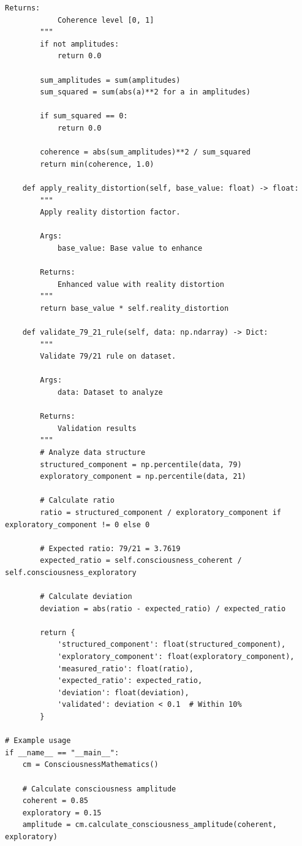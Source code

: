 \begin{lstlisting}[caption={79/21 Universal Coherence Rule Implementation},label={code:consciousness_math}]
        Returns:
            Coherence level [0, 1]
        """
        if not amplitudes:
            return 0.0
        
        sum_amplitudes = sum(amplitudes)
        sum_squared = sum(abs(a)**2 for a in amplitudes)
        
        if sum_squared == 0:
            return 0.0
        
        coherence = abs(sum_amplitudes)**2 / sum_squared
        return min(coherence, 1.0)
    
    def apply_reality_distortion(self, base_value: float) -> float:
        """
        Apply reality distortion factor.
        
        Args:
            base_value: Base value to enhance
        
        Returns:
            Enhanced value with reality distortion
        """
        return base_value * self.reality_distortion
    
    def validate_79_21_rule(self, data: np.ndarray) -> Dict:
        """
        Validate 79/21 rule on dataset.
        
        Args:
            data: Dataset to analyze
        
        Returns:
            Validation results
        """
        # Analyze data structure
        structured_component = np.percentile(data, 79)
        exploratory_component = np.percentile(data, 21)
        
        # Calculate ratio
        ratio = structured_component / exploratory_component if exploratory_component != 0 else 0
        
        # Expected ratio: 79/21 = 3.7619
        expected_ratio = self.consciousness_coherent / self.consciousness_exploratory
        
        # Calculate deviation
        deviation = abs(ratio - expected_ratio) / expected_ratio
        
        return {
            'structured_component': float(structured_component),
            'exploratory_component': float(exploratory_component),
            'measured_ratio': float(ratio),
            'expected_ratio': expected_ratio,
            'deviation': float(deviation),
            'validated': deviation < 0.1  # Within 10%
        }

# Example usage
if __name__ == "__main__":
    cm = ConsciousnessMathematics()
    
    # Calculate consciousness amplitude
    coherent = 0.85
    exploratory = 0.15
    amplitude = cm.calculate_consciousness_amplitude(coherent, exploratory)
    

\end{lstlisting}
